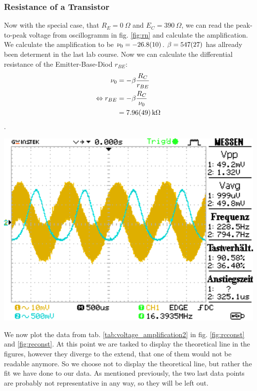 \documentclass[a4paper,10pt]{article}
\newenvironment{Figure}
  {\par\medskip\noindent\minipage{\linewidth}}
  {\endminipage\par\medskip} %
\numberwithin{equation}{section}
\begin{document}
\begin{multicols}{2}
	\subsubsection*{Resistance of a Transistor}
	Now with the special case, that $R_E=\SI{0}{\Omega}$ and $E_C=\SI{390}{\Omega}$, we can read the peak-to-peak voltage from oscillogramm in fig. \ref{fig:rn} and calculate the amplification. We calculate the amplification to be $\nu_0=\SI{-26.8+-1.0}{}$. $\beta=\SI{547+-27}{}$ has allready been determent in the last lab course. Now we can calculate the differential resistance of the Emitter-Base-Diod $r_{BE}$:
	\begin{align*}
		\nu_0                  & =-\beta\frac{R_C}{r_{BE}}     \\
		\Leftrightarrow r_{BE} & =-\beta\frac{R_C}{\nu_0}      \\
		                       & =\SI{7.96+-0.49}{\kilo\Omega}
	\end{align*}
	.
	\begin{Figure}
		\centering
		\includegraphics[width=1\textwidth]{../data/DS0022.png}
		\label{fig:rn}
	\end{Figure}
	We now plot the data from tab. \ref{tab:voltage_amplification2} in fig. \ref{fig:rcconst} and \ref{fig:reconst}. At this point we are tasked to display the theoretical line in the figures, however they diverge to the extend, that one of them would not be readable anymore. So we choose not to display the theoretical line, but rather the fit we have done to our data. As mentioned previously, the two last data points are probably not representative in any way, so they will be left out.

\end{multicols}
\end{document}

